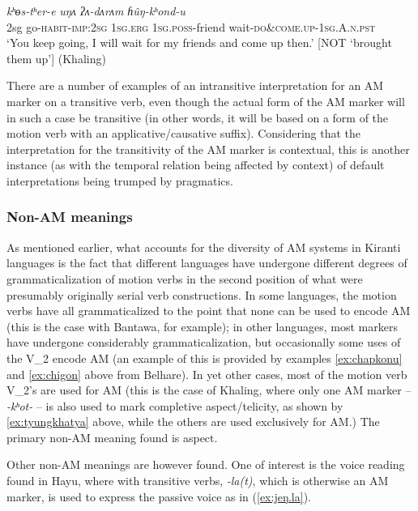 \documentclass[oneside,a4paper,11pt]{article}
\newcommand{\ipa}[1]{{\phon\textit{#1}}}
\newcommand{\rouge}[1]{{\color{red}#1}}
\begin{document}
\begin{exe}  
\ex \label{ex:hungkhondu}
 \gll  \ipa{ʔīn} \ipa{kʰɵs-tʰer-e} \ipa{uŋʌ} \ipa{ʔʌ-dʌrʌm} \ipa{ɦûŋ-\rouge{kʰond}-u} \\
 2sg go-\textsc{habit}-\textsc{imp}:\textsc{2sg} \textsc{1sg}.\textsc{erg} \textsc{1sg}.\textsc{poss}-friend wait-\rouge{\textsc{do\&come.up}}-\textsc{1sg.A.n.pst} \\
\glt `You keep going, I will wait for my friends and come up then.' [NOT `brought them up'] (Khaling)
\end{exe}

 There are a number of examples of an intransitive interpretation for an AM marker on a transitive verb, even though the actual form of the AM marker will in such a case be transitive (in other words, it will be based on a form of the motion verb with an applicative/causative suffix).  Considering that the interpretation for the transitivity of the AM marker is contextual, this is another instance (as with the temporal relation being affected by context) of default interpretations being trumped by pragmatics.
  

 \subsubsection{Non-AM meanings} \label{sec:khaling.non.am}
As mentioned earlier, what accounts for the diversity of AM systems in Kiranti languages is the fact that different languages have undergone different degrees of grammaticalization of motion verbs in the second position of what were presumably originally serial verb constructions.  In some languages, the motion verbs have all grammaticalized to the point that none can be used to encode AM (this is the case with Bantawa, for example); in other languages, most markers have undergone considerably grammaticalization, but occasionally some uses of the V_2 encode AM (an example of this is provided by examples  \ref{ex:chapkonu} and \ref{ex:chigon} above from Belhare).  In yet other cases, most of the motion verb V_2's are used for AM (this is the case of Khaling, where only one AM marker -- \ipa{-kʰot-} -- is also used to mark completive aspect/telicity, as shown by \ref{ex:tyungkhatya} above, while the others are used exclusively for AM.)  
The primary non-AM meaning found is aspect.

Other non-AM meanings are however found.  One of interest is the voice reading found in Hayu, where with transitive verbs, \ipa{-la(t)}, which is otherwise an AM marker, is used to express the passive voice as in (\ref{ex:jeŋ.la}).
\end{document}
